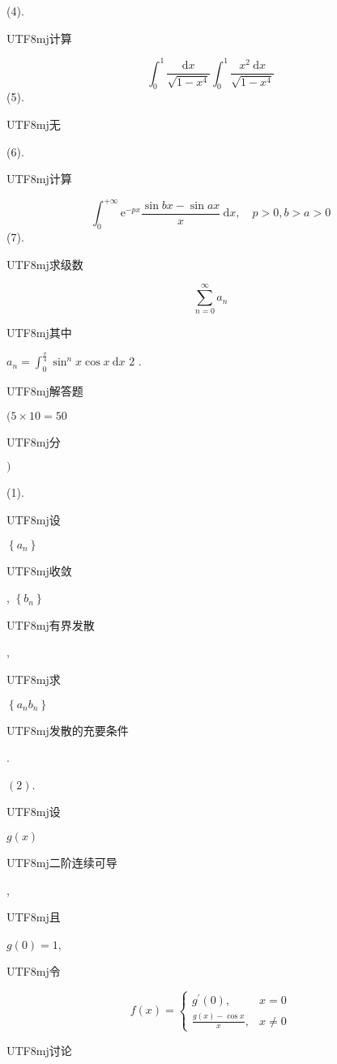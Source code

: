 \documentclass[10pt]{article}
\begin{document}
(4). \begin{CJK}{UTF8}{mj}计算\end{CJK}
$$
\int_{0}^{1} \frac{\mathrm{d} x}{\sqrt{1-x^{4}}} \int_{0}^{1} \frac{x^{2} \mathrm{~d} x}{\sqrt{1-x^{4}}}
$$
(5). \begin{CJK}{UTF8}{mj}无\end{CJK}

(6). \begin{CJK}{UTF8}{mj}计算\end{CJK}
$$
\int_{0}^{+\infty} \mathrm{e}^{-p x} \frac{\sin b x-\sin a x}{x} \mathrm{~d} x, \quad p>0, b>a>0
$$
(7). \begin{CJK}{UTF8}{mj}求级数\end{CJK}
$$
\sum_{n=0}^{\infty} a_{n}
$$
\begin{CJK}{UTF8}{mj}其中\end{CJK} $a_{n}=\int_{0}^{\frac{\pi}{4}} \sin ^{n} x \cos x \mathrm{~d} x$ 2 . \begin{CJK}{UTF8}{mj}解答题\end{CJK} $(5 \times 10=50$ \begin{CJK}{UTF8}{mj}分\end{CJK} $)$

(1). \begin{CJK}{UTF8}{mj}设\end{CJK} $\left\{a_{n}\right\}$ \begin{CJK}{UTF8}{mj}收敛\end{CJK}, $\left\{b_{n}\right\}$ \begin{CJK}{UTF8}{mj}有界发散\end{CJK}, \begin{CJK}{UTF8}{mj}求\end{CJK} $\left\{a_{n} b_{n}\right\}$ \begin{CJK}{UTF8}{mj}发散的充要条件\end{CJK}.

$(2)$. \begin{CJK}{UTF8}{mj}设\end{CJK} $g(x)$ \begin{CJK}{UTF8}{mj}二阶连续可导\end{CJK}, \begin{CJK}{UTF8}{mj}且\end{CJK} $g(0)=1$, \begin{CJK}{UTF8}{mj}令\end{CJK}
$$
f(x)= \begin{cases}g^{\prime}(0), & x=0 \\ \frac{g(x)-\cos x}{x}, & x \neq 0\end{cases}
$$
\begin{CJK}{UTF8}{mj}讨论\end{CJK}
\end{document}

